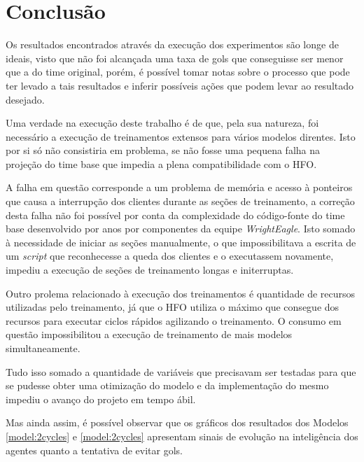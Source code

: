 \chapter{Conclusão}\label{sec:conclusion}

Os resultados encontrados através da execução dos experimentos são longe de
ideais, visto que não foi alcançada uma taxa de gols que conseguisse ser menor
que a do time original, porém, é possível tomar notas sobre o processo que pode
ter levado a tais resultados e inferir possíveis ações que podem levar ao
resultado desejado.

Uma verdade na execução deste trabalho é de que,
pela sua natureza, foi necessário a execução de treinamentos extensos para
vários modelos direntes. Isto por si só não consistiria em problema, se não
fosse uma pequena falha na projeção do time base que impedia a plena
compatibilidade com o HFO.

A falha em questão corresponde a um problema de memória e acesso à ponteiros que
causa a interrupção dos clientes durante as seções de treinamento, a correção
desta falha não foi possível por conta da complexidade do código-fonte do time
base desenvolvido por anos por componentes da equipe \textit{WrightEagle}. Isto
somado à necessidade de iniciar as seções manualmente, o que impossibilitava a
escrita de um \textit{script} que reconhecesse a queda dos clientes e o
executassem novamente, impediu a execução de seções de treinamento longas e
initerruptas.

Outro prolema relacionado à execução dos treinamentos é quantidade de recursos
utilizadas pelo treinamento, já que o HFO utiliza o máximo que consegue dos
recursos para executar ciclos rápidos agilizando o treinamento. O consumo em
questão impossibilitou a execução de treinamento de mais modelos
simultaneamente.

Tudo isso somado a quantidade de variáveis que precisavam ser testadas para que
se pudesse obter uma otimização do modelo e da implementação do mesmo impediu o
avanço do projeto em tempo ábil.

Mas ainda assim, é possível observar que os gráficos dos resultados dos Modelos
\ref{model:2cycles} e \ref{model:2cycles} apresentam sinais de evolução na
inteligência dos agentes quanto a tentativa de evitar gols.

